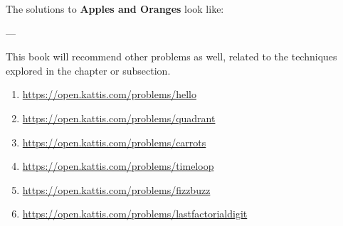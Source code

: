 The solutions to \textbf{Apples and Oranges} look like:


---

This book will recommend other problems as well, related to the techniques explored in the chapter or subsection.

\begin{enumerate}
\item \url{https://open.kattis.com/problems/hello}
\item \url{https://open.kattis.com/problems/quadrant}
\item \url{https://open.kattis.com/problems/carrots}
\item \url{https://open.kattis.com/problems/timeloop}
\item \url{https://open.kattis.com/problems/fizzbuzz}
\item \url{https://open.kattis.com/problems/lastfactorialdigit}
\end{enumerate}

